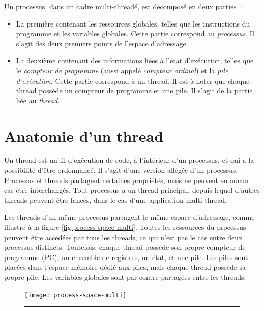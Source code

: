 Un processus, dans un cadre multi-threadé, est décomposé en deux parties~:
\begin{itemize}
\item La première contenant les ressources globales, telles que les instructions du programme et les variables globales. Cette partie correspond au \emph{processus}. Il s'agit des deux premiers points de l'espace d'adressage.
\item La deuxième contenant des informations liées à l'état d'exécution, telles que le \emph{compteur de programme} (aussi appelé \emph{compteur ordinal}) et la \emph{pile d'exécution}. Cette partie correspond à un thread. Il est à noter que chaque thread possède un compteur de programme et une pile. Il s'agit de la partie liée au \emph{thread}.
\end{itemize}

\section{Anatomie d'un thread}

Un thread est un fil d'exécution de code, à l'intérieur d'un processus, et qui a la possibilité d'être ordonnancé. Il s'agit d'une version allégée d'un processus. Processus et threads partagent certaines propriétés, mais ne peuvent en aucun cas être interchangés. Tout processus a un thread principal, depuis lequel d'autres threads peuvent être lancés, dans le cas d'une application multi-thread.

Les threads d'un même processus partagent le même espace d'adressage, comme illustré à la figure \ref{fig:process-space-multi}. Toutes les ressources du processus peuvent être accédées par tous les threads, ce qui n'est pas le cas entre deux processus distincts. Toutefois, chaque thread possède son propre compteur de programme (PC), un ensemble de registres, un état, et une pile. Les piles sont placées dans l'espace mémoire dédié aux piles, mais chaque thread possède sa propre pile. Les variables globales sont par contre partagées entre les threads.

\begin{figure}[!ht]
\begin{center}
\texttt{[image: process-space-multi]}
\end{center}
\vspace{-.3cm}
\rule{\textwidth}{0.01in}
\end{figure}


